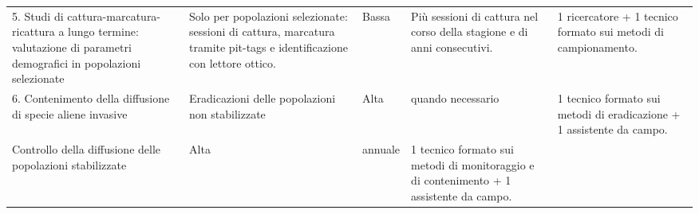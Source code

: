 \documentclass[11pt,a4paper,italian,twoside,openany]{memoir}
\begin{document}
\begin{longtable}[c]{@{}p{}p{}p{}p{}p{}@{}}
5. Studi di cattura-marcatura-ricattura a lungo termine: valutazione di parametri demografici in popolazioni selezionate & Solo per popolazioni selezionate: sessioni di cattura, marcatura tramite pit-tags e identificazione con lettore ottico. & Bassa & Più sessioni di cattura nel corso della stagione e di anni consecutivi. & 1 ricercatore + 1 tecnico formato sui metodi di campionamento. \\
\rowcolor[HTML]{EFEFEF}6. Contenimento della diffusione di specie aliene invasive & Eradicazioni delle popolazioni non stabilizzate & Alta & quando necessario & 1 tecnico formato sui metodi di eradicazione + 1 assistente da campo. \\
Controllo della diffusione delle popolazioni stabilizzate & Alta & annuale & 1 tecnico formato sui metodi di monitoraggio e di contenimento  + 1 assistente da campo. &  \\* \bottomrule
\end{longtable}
\newpage
\end{document}
